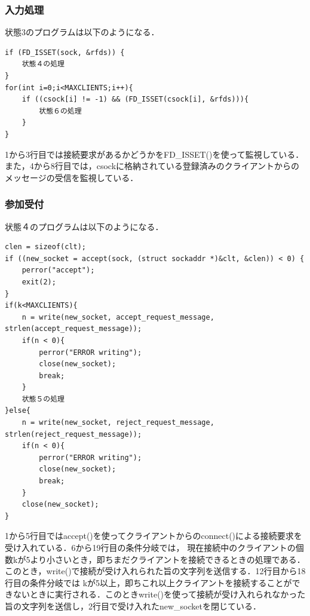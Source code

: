 \documentclass[dvipdfmx]{jarticle}
\begin{document}
\subsubsection{入力処理}
状態3のプログラムは以下のようになる．
\begin{lstlisting}
if (FD_ISSET(sock, &rfds)) {
    状態４の処理        
}
for(int i=0;i<MAXCLIENTS;i++){
    if ((csock[i] != -1) && (FD_ISSET(csock[i], &rfds))){
        状態６の処理
    }
}
\end{lstlisting}
1から3行目では接続要求があるかどうかをFD\_ISSET()を使って監視している．また，4から8行目では，csockに格納されている登録済みのクライアントからのメッセージの受信を監視している．
\subsubsection{参加受付}
状態４のプログラムは以下のようになる．
\begin{lstlisting}
clen = sizeof(clt);
if ((new_socket = accept(sock, (struct sockaddr *)&clt, &clen)) < 0) {
    perror("accept");
    exit(2);
}
if(k<MAXCLIENTS){
    n = write(new_socket, accept_request_message, strlen(accept_request_message));
    if(n < 0){
        perror("ERROR writing");
        close(new_socket);
        break;
    }
    状態５の処理
}else{
    n = write(new_socket, reject_request_message, strlen(reject_request_message));
    if(n < 0){
        perror("ERROR writing");
        close(new_socket);
        break;
    }
    close(new_socket);
}
\end{lstlisting}
1から5行目ではaccept()を使ってクライアントからのconnect()による接続要求を受け入れている．6から19行目の条件分岐では，
現在接続中のクライアントの個数kが5より小さいとき，即ちまだクライアントを接続できるときの処理である．このとき，write()で接続が受け入れられた旨の文字列を送信する．12行目から18行目の条件分岐では
kが5以上，即ちこれ以上クライアントを接続することができないときに実行される．このときwrite()を使って接続が受け入れられなかった旨の文字列を送信し，2行目で受け入れたnew\_socketを閉じている．
\end{document}
